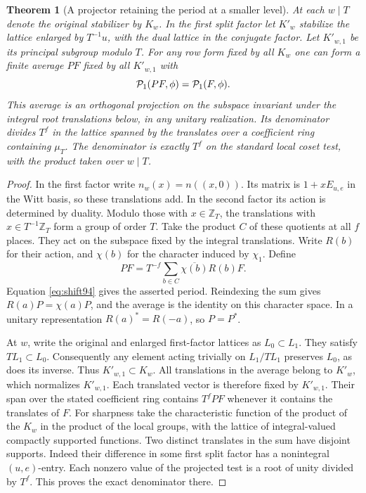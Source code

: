 \documentclass[a4paper,11pt]{article}
\newtheorem{theorem}[proposition]{Theorem}
\theoremstyle{definition}
\theoremstyle{remark}
\newcommand{\ZZ}{\mathbb Z}\newcommand{\ord}{\operatorname{ord}}
\numberwithin{equation}{section}
\begin{document}
\begin{theorem}[A projector retaining the period at a smaller level]
\label{thm:project94}
At each \(w\mid T\) denote the original stabilizer by \(K_w\).
In the first split factor let \(K'_w\) stabilize the lattice
enlarged by \(T^{-1}u\), with the dual lattice in the conjugate
factor. Let \(K'_{w,1}\) be its principal subgroup modulo \(T\).
For any row form fixed by all \(K_w\) one can form a finite average
\(P F\) fixed by all \(K'_{w,1}\) with
\[
           {\cal P}_1(PF,\phi)={\cal P}_1(F,\phi).
\]
This average is an orthogonal projection on the subspace invariant
under the integral root translations below, in any unitary
realization. Its denominator divides \(T^f\) in the lattice spanned
by the translates over a coefficient ring containing \(\mu_T\).
The denominator is exactly \(T^f\) on the standard local coset test,
with the product taken over \(w\mid T\).
\end{theorem}
\begin{proof}
In the first factor write \(n_w(x)=n((x,0))\). Its matrix is
\(1+xE_{u,e}\) in the Witt basis, so these translations add.
In the second factor its action is determined by duality.
Modulo those with \(x\in\ZZ_T\), the translations with
\(x\in T^{-1}\ZZ_T\) form a group of order \(T\).
Take the product \(C\) of these quotients at all \(f\) places.
They act on the subspace fixed by the integral translations.
Write \(R(b)\) for their action, and \(\chi(b)\) for the
character induced by \(\chi_1\). Define
\[
                  PF=T^{-f}\sum_{b\in C}\overline{\chi(b)}R(b)F.
\]
Equation \eqref{eq:shift94} gives the asserted period. Reindexing
the sum gives \(R(a)P=\chi(a)P\), and the average is the identity
on this character space. In a unitary representation \(R(a)^*=R(-a)\),
so \(P=P^*\).

At \(w\), write the original and enlarged first-factor lattices as
\(L_0\subset L_1\). They satisfy \(TL_1\subset L_0\).
Consequently any element acting trivially on \(L_1/TL_1\) preserves
\(L_0\), as does its inverse. Thus \(K'_{w,1}\subset K_w\).
All translations in the average belong to \(K'_w\), which normalizes
\(K'_{w,1}\). Each translated vector is therefore fixed by
\(K'_{w,1}\). Their span over the stated coefficient ring contains
\(T^fPF\) whenever it contains the translates of \(F\).
For sharpness take the characteristic function of the product of
the \(K_w\) in the product of the local groups, with the lattice
of integral-valued compactly supported functions. Two distinct
translates in the sum have disjoint supports. Indeed their
difference in some first split factor has a nonintegral
\((u,e)\)-entry. Each nonzero value of the projected test is
a root of unity divided by \(T^f\). This proves the exact
denominator there.
\end{proof}
\end{document}
